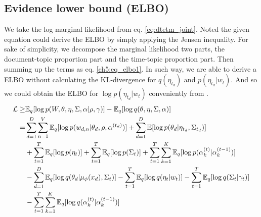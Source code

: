 \subsection{Evidence lower bound (ELBO)}
We take the log marginal likelihood from eq. \ref{eq:dtetm_joint}. Noted the given equation could derive the ELBO by simply applying the Jensen inequality. For sake of simplicity, we decompose the marginal likelihood two parts, the document-topic proportion part and the time-topic proportion part. Then summing up the terms as eq. \ref{ch5:eq_elbo1}. In such way, we are able to derive a ELBO without calculating the KL-divergence for $ q(\eta_{t_d}) $ and $ p(\eta_{t_d}|w_t) $. And so we could obtain the ELBO for $ \log p(\eta_{t_d}|w_t) $ conveniently from \cite{titsias_bayesian_2010}.
\begin{align}\label{ch5:eq_elbo1}
\mathcal{L}\geq&\mathbb{E}_q[\log p(W,\theta,\eta,\Sigma,\alpha|\rho,\gamma)]-\mathbb{E}_q[\log q(\theta,\eta,\Sigma,\alpha)]\notag\\
=&\sum_{d=1}^{D}\sum_{n=1}^{V}\mathbb{E}_q[\log p(w_{d,n}|\theta_d,\rho,\alpha^{(t_d)})]+\sum_{d=1}^{D}\mathbb{E}[\log p(\theta_d|\eta_{t_d},\Sigma_{t_d})]\notag\\
&+\sum_{t=1}^{T}\mathbb{E}_{q}[\log p(\eta_{t})]+\sum_{t=1}^{T}\mathbb{E}_q[\log p(\Sigma_{t})]+\sum_{t=1}^{T}\sum_{k=1}^{K}\mathbb{E}_{q}[\log p(\alpha_{k}^{(t)}|\alpha_{k}^{(t-1)})]\notag\\
&-\sum_{d=1}^{D}\mathbb{E}_q[\log q(\theta_d|\mu_{\phi}(x_d),\Sigma_{t})]-\sum_{t=1}^{T}\mathbb{E}_{q}[\log q(\eta_{t}|w_{t})]-\sum_{t=1}^{T}\mathbb{E}_q[\log q(\Sigma_{t}|\gamma_{t})]\notag\\
&-\sum_{t=1}^{T}\sum_{k=1}^{K}\mathbb{E}_q[\log q(\alpha_{k}^{(t)}|\alpha_{k}^{(t-1)})]
\end{align}
